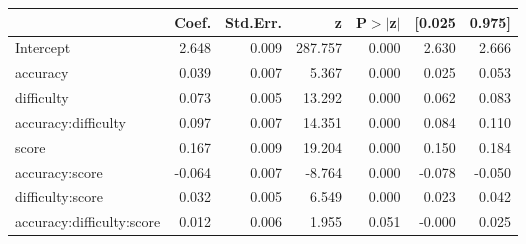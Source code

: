 \documentclass[a4paper,man,natbib]{apa6}
\begin{document}
\begin{table}
\begin{center}
\begin{tabular}{lrrrrrr}
\hline
&  Coef. & Std.Err. & z & P$> |$z$|$ & [0.025 & 0.975]  \\
\hline
Intercept &  2.648 &    0.009 & 287.757 &       0.000 &  2.630 &  2.666  \\
accuracy &  0.039 &    0.007 &   5.367 &       0.000 &  0.025 &  0.053  \\
difficulty &  0.073 &    0.005 &  13.292 &       0.000 &  0.062 &  0.083  \\
accuracy:difficulty &  0.097 &    0.007 &  14.351 &       0.000 &  0.084 &  0.110  \\
score &  0.167 &    0.009 &  19.204 &       0.000 &  0.150 &  0.184  \\
accuracy:score & -0.064 &    0.007 &  -8.764 &       0.000 & -0.078 & -0.050  \\
difficulty:score &  0.032 &    0.005 &   6.549 &       0.000 &  0.023 &  0.042  \\
accuracy:difficulty:score &  0.012 &    0.006 &   1.955 &       0.051 & -0.000 &  0.025  \\
\hline
\end{tabular}
\end{center}
\end{table}
\end{document}

